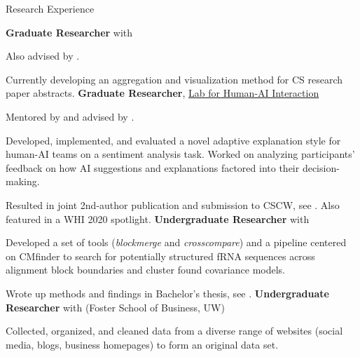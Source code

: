 \begin{rubric}{Research Experience}

	\textbf{Graduate Researcher} with \pGlassmanE{}
	\par Also advised by \pWeldD{}.
	\par Currently developing an aggregation and visualization method for CS research paper abstracts.
	\textbf{Graduate Researcher}, \href{http://hai.cs.washington.edu}{Lab for Human-AI Interaction}
	\par Mentored by \pBansalG{} and advised by \pWeldD{}.
	\par Developed, implemented, and evaluated a novel adaptive explanation style for human-AI teams on a sentiment analysis task. Worked on analyzing participants' feedback on how AI suggestions and explanations factored into their decision-making.
	\par Resulted in joint 2nd-author publication and submission to CSCW, see \cite{bansal2020does}. Also featured in a WHI 2020 spotlight.
\entry*[2018 -- 2019] %
    \textbf{Undergraduate Researcher} with \pRuzzoL{}
    \par Developed a set of tools (\textit{blockmerge} and \textit{crosscompare}) and a pipeline centered on CMfinder to search for potentially structured fRNA sequences across alignment block boundaries and cluster found covariance models.
    \par Wrote up methods and findings in Bachelor's thesis, see \cite{zhou2019thesis}.
\entry*[2018 -- 2019] %
	\textbf{Undergraduate Researcher} with \pPahnkeE{} (Foster School of Business, UW)
	\par Collected, organized, and cleaned data from a diverse range of websites (social media, blogs, business homepages) to form an original data set.
\end{rubric}